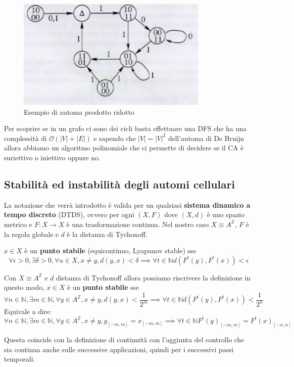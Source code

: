 \begin{figure}[!h]
    \centering
    \includegraphics[width=.7\textwidth]{img/sistemi_complessi/automa_prodotto_ridotto.png}
    \caption{Esempio di automa prodotto ridotto}
    \label{fig:automa_prodotto_ridotto}
\end{figure}

Per scoprire se in un grafo ci sono dei cicli basta effettuare una DFS che ha una 
complessità di $\mathcal{O}(|V|+|E|)$ e sapendo che $|V|= |V|^2$ dell'automa di 
De Bruijn allora abbiamo un algoritmo polinomiale che ci permette di decidere 
se il CA è suriettivo o iniettivo oppure no.

\subsection{Stabilità ed instabilità degli automi cellulari}
La notazione che verrà introdotto è valida per un qualsiasi \textbf{sistema dinamico a tempo 
discreto} (DTDS), ovvero per ogni $(X,F)$ dove $(X,d)$ è uno spazio metrico e 
$F:X\rightarrow X$ è una trasformazione continua. Nel nostro caso $X \equiv A^\mathbb{Z}$,
$F$ è la regola globale e $d$ è la distanza di Tychonoff.

\begin{definizione} 
    $x\in X$ è un \textbf{punto stabile} (equicontinuo, Lyapunov stable) sse
    $$\forall \epsilon > 0,\exists \delta > 0, \forall u\in X,x \ne y, d(y,x) < \delta \implies \forall t\in \mathbb{N} d(F^t(y),F^t(x))< \epsilon$$
    
    Con $X \equiv A^\mathbb{Z}$ e $d$ distanza di Tychonoff allora possiamo riscrivere 
    la definizione in questo modo, $x\in X$ è un \textbf{punto stabile} sse
    $$\forall n\in \mathbb{N} ,\exists m\in \mathbb{N} , \forall y\in A^\mathbb{Z},x \ne y, d(y,x) < \frac{1}{2^m} \implies \forall t\in \mathbb{N} d(F^t(y),F^t(x))< \frac{1}{2^n}$$
    Equivale a dire:
    $$\forall n\in \mathbb{N} ,\exists m\in \mathbb{N} , \forall y\in A^\mathbb{Z},x \ne y, y_{[-m,m]} = x_{[-m,m]} \implies \forall t\in \mathbb{N} F^t(y)_{[-m,m]}=F^t(x)_{[-n,n]}$$
    
\end{definizione}
Questa coincide con la definizione di continuità con l'aggiunta del controllo che 
sia continua anche sulle successive applicazioni, quindi per i successivi passi 
temporali.

